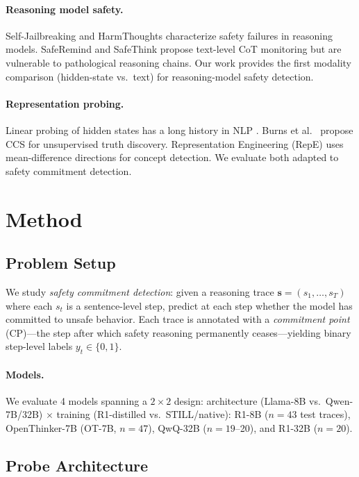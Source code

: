 \documentclass[11pt]{article}
\begin{document}
\paragraph{Reasoning model safety.}
Self-Jailbreaking \cite{ren2025selfharm} and HarmThoughts \cite{wang2025harmthoughts} characterize safety failures in reasoning models.
SafeRemind \cite{wang2025saferemind} and SafeThink \cite{qi2025safethink} propose text-level CoT monitoring but are vulnerable to pathological reasoning chains.
Our work provides the first modality comparison (hidden-state vs.\ text) for reasoning-model safety detection.

\paragraph{Representation probing.}
Linear probing of hidden states has a long history in NLP \cite{belinkov2022probing}.
Burns et al.\ \cite{burns2023ccs} propose CCS for unsupervised truth discovery.
Representation Engineering (RepE) \cite{zou2023repe} uses mean-difference directions for concept detection.
We evaluate both adapted to safety commitment detection.


\section{Method}

\subsection{Problem Setup}

We study \emph{safety commitment detection}: given a reasoning trace $\mathbf{s} = (s_1, \ldots, s_T)$ where each $s_t$ is a sentence-level step, predict at each step whether the model has committed to unsafe behavior.
Each trace is annotated with a \emph{commitment point} (CP)---the step after which safety reasoning permanently ceases---yielding binary step-level labels $y_t \in \{0, 1\}$.

\paragraph{Models.}
We evaluate 4 models spanning a $2 \times 2$ design: architecture (Llama-8B vs.\ Qwen-7B/32B) $\times$ training (R1-distilled vs.\ STILL/native): R1-8B ($n{=}43$ test traces), OpenThinker-7B (OT-7B, $n{=}47$), QwQ-32B ($n{=}19$--20), and R1-32B ($n{=}20$).

\subsection{Probe Architecture}
\end{document}
